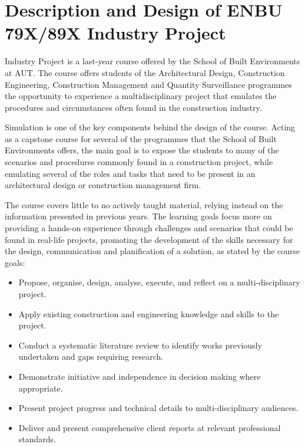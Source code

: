 \section{Description and Design of ENBU 79X/89X Industry Project \label{sec:6-1}}

Industry Project is a last-year course offered by the School of Built Environments at \acf{AUT}. The course offers students of the Architectural Design, Construction Engineering,
Construction Management and Quantity Surveillance programmes the opportunity to experience a multidisciplinary project that emulates the procedures and circumstances often
found in the construction industry.

Simulation is one of the key components behind the design of the course. Acting as a capstone course for several of the programmes that the School of Built Environments
offers, the main goal is to expose the students to many of the scenarios and procedures commonly found in a construction project, while emulating several of the roles and
tasks that need to be present in an architectural design or construction management firm.

The course covers little to no actively taught material, relying instead on the information presented in previous years. The learning goals focus more on providing a hands-on
experience through challenges and scenarios that could be found in real-life projects, promoting the development of the skills necessary for the design, communication and
planification of a solution, as stated by the course goals:

\begin{itemize}
    \item Propose, organise, design, analyse, execute, and reflect on a multi-disciplinary project.
    \item Apply existing construction and engineering knowledge and skills to the project.
    \item Conduct a systematic literature review to identify works previously undertaken and gaps requiring research.
    \item Demonstrate initiative and independence in decision making where appropriate.
    \item Present project progress and technical details to multi-disciplinary audiences.
    \item Deliver and present comprehensive client reports at relevant professional standards.
\end{itemize}

